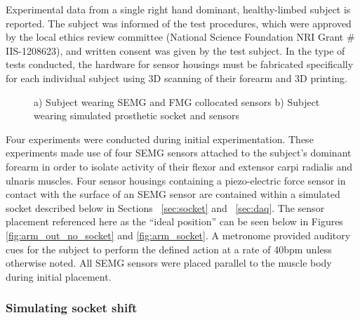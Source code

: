 \documentclass[twocolumn]{sagej}
\begin{document}
Experimental data from a single right hand dominant, healthy-limbed subject is reported.  The subject was informed of the test procedures, which were approved by the local ethics review committee (National Science Foundation NRI Grant $\#$IIS-1208623), and written consent was given by the test subject.  In the type of tests conducted, the hardware for sensor housings must be fabricated specifically for each individual subject using 3D scanning of their forearm and 3D printing.  \par \noindent
\begin{figure}[htbp]
\centering
{}
 \caption{a) Subject wearing SEMG and FMG collocated sensors b) Subject wearing simulated prosthetic socket and sensors}

\end{figure}
Four experiments were conducted during initial experimentation.  These experiments made use of four SEMG sensors attached to the subject's dominant forearm in order to isolate activity of their flexor and extensor carpi radialis and ulnaris muscles.  Four sensor housings containing a piezo-electric force sensor in contact with the surface of an SEMG sensor are contained within a simulated socket described below in Sections ~\ref{sec:socket} and ~\ref{sec:daq}. The sensor placement referenced here as the ``ideal position'' can be seen below in Figures \ref{fig:arm_out_no_socket} and \ref{fig:arm_socket}. A  metronome provided auditory cues for the subject to perform the defined action at a rate of 40bpm unless otherwise noted.  All SEMG sensors were placed parallel to the muscle body during initial placement. \par \noindent

\subsubsection{Simulating socket shift}
\label{sec:exp_prot-shift}
\end{document}
